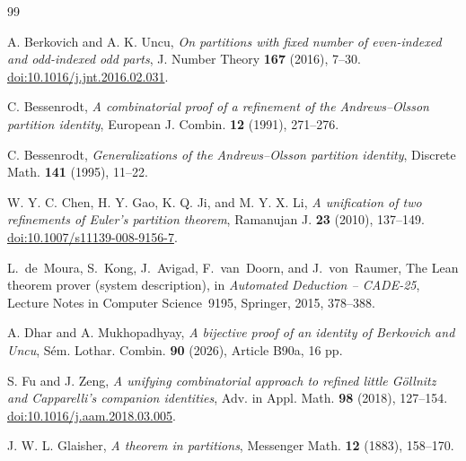 \documentclass[11pt]{amsart}
\theoremstyle{definition}
\theoremstyle{remark}
\begin{document}
\begin{thebibliography}{99}

A. Berkovich and A. K. Uncu,
\emph{On partitions with fixed number of even-indexed and odd-indexed odd parts},
J. Number Theory \textbf{167} (2016), 7--30.
\href{https://doi.org/10.1016/j.jnt.2016.02.031}{doi:10.1016/j.jnt.2016.02.031}.

C. Bessenrodt,
\emph{A combinatorial proof of a refinement of the Andrews--Olsson partition
identity},
European J. Combin. \textbf{12} (1991), 271--276.

C. Bessenrodt,
\emph{Generalizations of the Andrews--Olsson partition identity},
Discrete Math. \textbf{141} (1995), 11--22.

W. Y. C. Chen, H. Y. Gao, K. Q. Ji, and M. Y. X. Li,
\emph{A unification of two refinements of Euler's partition theorem},
Ramanujan J. \textbf{23} (2010), 137--149.
\href{https://doi.org/10.1007/s11139-008-9156-7}{doi:10.1007/s11139-008-9156-7}.

L.~de~Moura, S.~Kong, J.~Avigad, F.~van~Doorn, and J.~von~Raumer,
The {L}ean theorem prover (system description),
in \emph{Automated Deduction -- CADE-25},
Lecture Notes in Computer Science~9195, Springer, 2015, 378--388.

A. Dhar and A. Mukhopadhyay,
\emph{A bijective proof of an identity of Berkovich and Uncu},
S\'em. Lothar. Combin. \textbf{90} (2026), Article B90a, 16 pp.

S. Fu and J. Zeng,
\emph{A unifying combinatorial approach to refined little G\"ollnitz and
Capparelli's companion identities},
Adv. in Appl. Math. \textbf{98} (2018), 127--154.
\href{https://doi.org/10.1016/j.aam.2018.03.005}{doi:10.1016/j.aam.2018.03.005}.

J. W. L. Glaisher,
\emph{A theorem in partitions},
Messenger Math. \textbf{12} (1883), 158--170.

\end{thebibliography}
\end{document}
